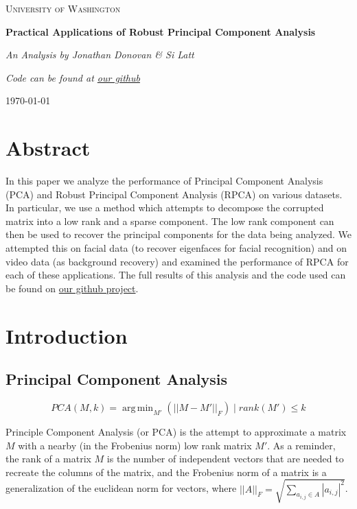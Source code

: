 \documentclass[11pt]{scrartcl} %
\DeclareMathOperator*{\argmin}{arg\,min}
\theoremstyle{plain}
\begin{document}
\begin{titlepage}
	\centering
	{\scshape\LARGE University of Washington\par}
	\vspace{1.5cm}
	{\huge\bfseries Practical Applications of Robust Principal Component Analysis\par}
	\vspace{2cm}
	{\Large\itshape  An Analysis by Jonathan Donovan \& Si Latt\par}

	\vfill

	{\itshape Code can be found at \href{https://github.com/Cynocracy/principal-component-analysis}{our github} \par}
	{\large \today\par}
\end{titlepage}


\section{Abstract}
In this paper we analyze the performance of Principal Component Analysis (PCA) and Robust Principal Component Analysis (RPCA) on various datasets. In particular, we use a method\cite{iaml} which attempts to decompose the corrupted matrix into a low rank and a sparse component. The low rank component can then be used to recover the principal components for the data being analyzed. We attempted this on facial data (to recover eigenfaces for facial recognition) and on video data (as background recovery) and examined the performance of RPCA for each of these applications. The full results of this analysis and the code used can be found on \href{https://github.com/Cynocracy/principal-component-analysis}{our github project}.

\section{Introduction}

\subsection{Principal Component Analysis}

\[ PCA(M, k) =\argmin_{M'}(||M-M'||_F ) \mid rank(M') \le k \]

Principle Component Analysis\cite{pca} (or PCA) is the attempt to approximate a matrix $M$ with a nearby (in the Frobenius norm) low rank matrix $M'$. As a reminder, the rank of a matrix $M$ is the number of independent vectors that are needed to recreate the columns of the matrix, and the Frobenius norm of a matrix is a generalization of the euclidean norm for vectors, where $||A||_F = \sqrt{\sum_{a_{i,j} \in A}|a_{i,j}|^2}$.
\end{document}
